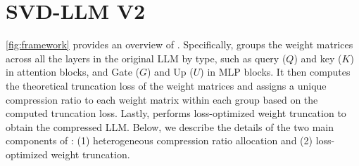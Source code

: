 \section{SVD-LLM V2}
\label{sec:methodology}



\cref{fig:framework} provides an overview of \sysname. 
%
Specifically, \sysname groups the weight matrices across all the layers in the original LLM by type, such as query ($Q$) and key ($K$) in attention blocks, and Gate ($G$) and Up ($U$) in MLP blocks. It then computes the theoretical truncation loss of the weight matrices and assigns a unique compression ratio to each weight matrix within each group based on the computed truncation loss.
Lastly, \sysname performs loss-optimized weight truncation to obtain the compressed LLM.
%
Below, we describe the details of the two main components of \sysname: (1) heterogeneous compression ratio allocation and (2) loss-optimized weight truncation. 
%



